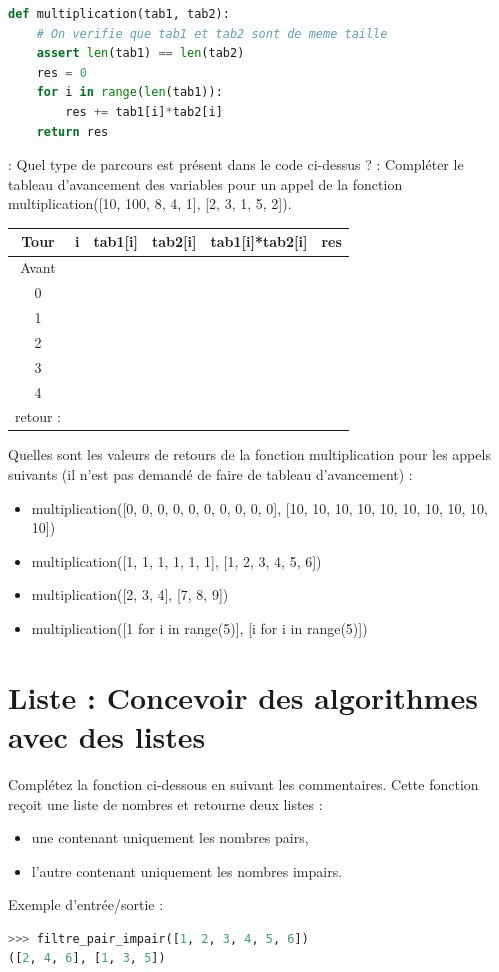 \documentclass[a4paper, noanswers, addpoints, 12pt]{exam}
\begin{document}
\begin{questions}
\begin{lstlisting}[language=Python]
def multiplication(tab1, tab2):
    # On verifie que tab1 et tab2 sont de meme taille
    assert len(tab1) == len(tab2)
    res = 0
    for i in range(len(tab1)):
        res += tab1[i]*tab2[i]
    return res
\end{lstlisting}
\question[1] : Quel type de parcours est présent dans le code ci-dessus ?
\question[3] : Compléter le tableau d'avancement des variables pour un appel de la fonction multiplication([10, 100, 8, 4, 1], [2, 3, 1, 5, 2]).\\
 \begin{center}
\large
\begin{tabular}{c|c|c|c|c|c|}
\textbf{Tour} & \textbf{i} & \textbf{tab1[i]} & \textbf{tab2[i]} & \textbf{tab1[i]*tab2[i]} & \textbf{res} \\
\hline
Avant & & & & &\\
0 &  &  &  & &\\
1 &  &  &  & &\\
2 &  &  &  & &\\
3 &  &  &  & &\\
4 &  &  &  & &\\
retour : \\
\end{tabular}
\end{center}

\question[2] Quelles sont les valeurs de retours de la fonction multiplication pour les appels suivants (il n'est pas demandé de faire de tableau d'avancement) : \\
\begin{itemize}
    \item multiplication([0, 0, 0, 0, 0, 0, 0, 0, 0, 0], [10, 10, 10, 10, 10, 10, 10, 10, 10, 10])
    \item multiplication([1, 1, 1, 1, 1, 1], [1, 2, 3, 4, 5, 6])
    \item multiplication([2, 3, 4], [7, 8, 9])
    \item multiplication([1 for i in range(5)], [i for i in range(5)])
\end{itemize}

\section{Liste : Concevoir des algorithmes avec des listes}

\question[3] Complétez la fonction ci-dessous en suivant les commentaires.
Cette fonction reçoit une liste de nombres et retourne deux listes :
\begin{itemize}
    \item une contenant uniquement les nombres pairs,
    \item l'autre contenant uniquement les nombres impairs.
\end{itemize}
Exemple d’entrée/sortie :
\begin{lstlisting}[language=Python]
>>> filtre_pair_impair([1, 2, 3, 4, 5, 6])
([2, 4, 6], [1, 3, 5])
\end{lstlisting}


\end{questions}
\end{document}
